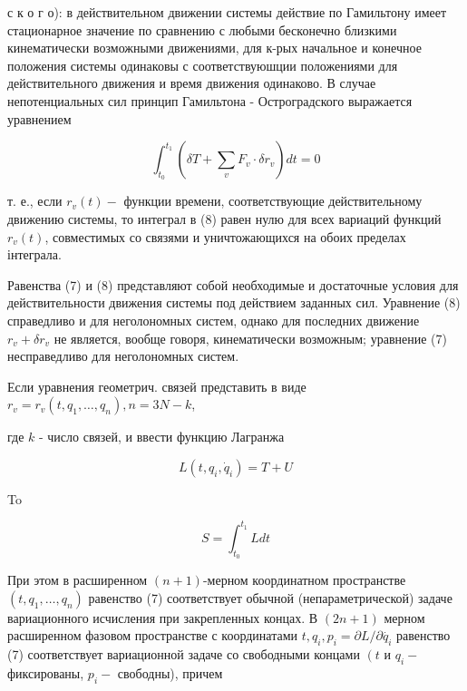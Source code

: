 \documentclass[10pt]{article}
\begin{document}
с к о г о): в действительном движении системы действие по Гамильтону имеет стационарное значение по сравнению с любыми бесконечно близкими кинематически возможными движениями, для к-рых начальное и конечное положения системы одинаковы с соответствуюшции положениями для действительного движения и время движения одинаково. В случае непотенциальных сил принцип Гамильтона - Остроградского выражается уравнением



\[

\int_{t_{0}}^{t_{1}}\left(\delta T+\sum_{v} F_{v} \cdot \delta r_{v}\right) d t=0

\]



т. е., если $r_{v}(t)-$ функции времени, соответствующие действительному движению системы, то интеграл в (8) равен нулю для всех вариаций функций $r_{v}(t)$, совместимых со связями и уничтожающихся на обоих пределах інтеграла.



Равенства (7) и (8) представляют собой необходимые и достаточные условия для действительности движения системы под действием заданных сил. Уравнение (8) справедливо и для неголономных систем, однако для последних движение $r_{v}+\delta r_{v}$ не является, вообще говоря, кинематически возможным; уравнение (7) несправедливо для неголономных систем.



Если уравнения геометрич. связей представить в виде $r_{v}=r_{v}\left(t, q_{1}, \ldots, q_{n}\right), n=3 N-k$,



где $k$ - число связей, и ввести функцию Лагранжа



\[

L\left(t, q_{i}, \dot{q}_{i}\right)=T+U

\]



To



\[

S=\int_{t_{0}}^{t_{1}} L d t

\]



При этом в расширенном $(n+1)$-мерном координатном пространстве $\left(t, q_{1}, \ldots, q_{n}\right)$ равенство (7) соответствует обычной (непараметрической) задаче вариационного исчисления при закрепленных концах. В $(2 n+1)$ мерном расширенном фазовом пространстве с координатами $t, q_{i}, p_{i}=\partial L / \partial \dot{q_{i}}$ равенство (7) соответствует вариационной задаче со свободными концами $\left(t\right.$ и $q_{i}-$ фиксированы, $p_{i}-$ свободны), причем
\end{document}
